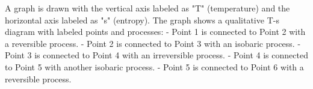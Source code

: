 A graph is drawn with the vertical axis labeled as "T" (temperature) and the horizontal axis labeled as "s" (entropy). The graph shows a qualitative T-s diagram with labeled points and processes:  
- Point 1 is connected to Point 2 with a reversible process.  
- Point 2 is connected to Point 3 with an isobaric process.  
- Point 3 is connected to Point 4 with an irreversible process.  
- Point 4 is connected to Point 5 with another isobaric process.  
- Point 5 is connected to Point 6 with a reversible process.